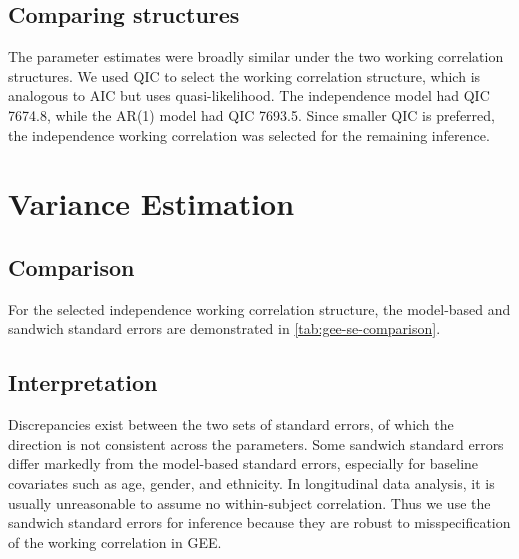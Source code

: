 \documentclass[12pt]{article}
\begin{document}
\subsection{Comparing structures}

The parameter estimates were broadly similar under the two working correlation
structures. We used QIC to select the working correlation structure, 
which is analogous to AIC but uses quasi-likelihood.
The independence model had QIC 7674.8, while the AR(1) model had
QIC 7693.5. Since smaller QIC is preferred, the independence working
correlation was selected for the remaining inference.

\section{Variance Estimation}

\subsection{Comparison}

For the selected independence working correlation structure, the model-based
and sandwich standard errors are demonstrated in \cref{tab:gee-se-comparison}.


\begingroup
\small
{}
\endgroup

\subsection{Interpretation}
Discrepancies exist between the two sets of standard errors,
of which the direction is not consistent across the parameters.
Some sandwich standard errors differ markedly from the model-based standard
errors, especially for baseline covariates such as age, gender, and ethnicity.
In longitudinal data analysis, it is usually unreasonable to assume
no within-subject correlation.
Thus we use the sandwich standard errors for inference
because they are robust to misspecification of the working correlation in GEE.
\end{document}
